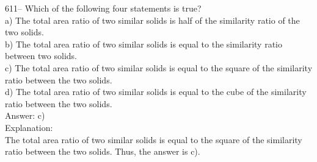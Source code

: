 \documentclass[letterpaper, 12pt]{article}
\begin{document}
611-- Which of the following four statements is true?\\

a) The total area ratio of two similar solids is half of the
similarity ratio of the two solids.\\
b) The total area ratio of two similar solids is equal to the similarity ratio
between two solids.\\
c) The total area ratio of two similar solids is equal to the square of the similarity
ratio between the two solids.\\
d) The total area ratio of two similar solids is equal to the cube of the similarity ratio between the two solids.\\

Answer: c)\\

Explanation: \\
The total area ratio of two similar solids is equal to the square of the similarity ratio between the two solids.
Thus, the answer is c).\\
\end{document}
